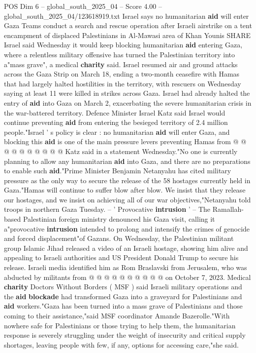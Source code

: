 \begin{textsample}{POS Dim 6 – global\_south\_2025\_04 – Score 4.00 – global\_south\_2025\_04/123618919.txt}  \label{ex:f6_pos_239}
Israel says no humanitarian \textbf{aid} will enter Gaza Teams conduct a search and rescue operation after Israeli airstrike on a tent encampment of displaced Palestinians in Al-Mawasi area of Khan Younis SHARE Israel said Wednesday it would keep blocking humanitarian \textbf{aid} entering Gaza, where a relentless military offensive has turned the Palestinian territory into a"mass grave", a medical \textbf{charity} said.
Israel resumed air and ground attacks across the Gaza Strip on March 18, ending a two-month ceasefire with Hamas that had largely halted hostilities in the territory, with rescuers on Wednesday saying at least 11 were killed in strikes across Gaza.
Israel had already halted the entry of \textbf{aid} into Gaza on March 2, exacerbating the severe humanitarian crisis in the war-battered territory.
Defence Minister Israel Katz said Israel would continue preventing \textbf{aid} from entering the besieged territory of 2.4 million people."Israel ' s policy is clear : no humanitarian \textbf{aid} will enter Gaza, and blocking this \textbf{aid} is one of the main pressure levers preventing Hamas from @ @ @ @ @ @ @ @ @ @ Katz said in a statement Wednesday."No one is currently planning to allow any humanitarian \textbf{aid} into Gaza, and there are no preparations to enable such \textbf{aid}."Prime Minister Benjamin Netanyahu has cited military pressure as the only way to secure the release of the 58 hostages currently held in Gaza."Hamas will continue to suffer blow after blow.
We insist that they release our hostages, and we insist on achieving all of our war objectives,"Netanyahu told troops in northern Gaza Tuesday. -- ' Provocative \textbf{intrusion} ' -- The Ramallah-based Palestinian foreign ministry denounced his Gaza visit, calling it a"provocative \textbf{intrusion} intended to prolong and intensify the crimes of genocide and forced displacement"of Gazans.
On Wednesday, the Palestinian militant group Islamic Jihad released a video of an Israeli hostage, showing him alive and appealing to Israeli authorities and US President Donald Trump to secure his release.
Israeli media identified him as Rom Braslavski from Jerusalem, who was abducted by militants from @ @ @ @ @ @ @ @ @ @ on October 7, 2023.
Medical \textbf{charity} Doctors Without Borders ( MSF ) said Israeli military operations and the \textbf{aid} \textbf{blockade} had transformed Gaza into a graveyard for Palestinians and \textbf{aid} workers."Gaza has been turned into a mass grave of Palestinians and those coming to their assistance,"said MSF coordinator Amande Bazerolle."With nowhere safe for Palestinians or those trying to help them, the humanitarian response is severely struggling under the weight of insecurity and critical supply shortages, leaving people with few, if any, options for accessing care,"she said.

\end{textsample}

